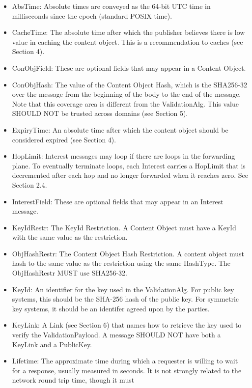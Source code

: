 \documentclass[12pt]{article}
\begin{document}
\begin{itemize}
\item AbsTime: Absolute times are conveyed as the 64-bit UTC time in
      milliseconds since the epoch (standard POSIX time).
\item CacheTime: The absolute time after which the publisher believes
      there is low value in caching the content object.  This is a
      recommendation to caches (see Section 4).
\item ConObjField: These are optional fields that may appear in a
      Content Object.
\item ConObjHash: The value of the Content Object Hash, which is the
   SHA256-32 over the message from the beginning of the body to the
   end of the message.  Note that this coverage area is different
   from the ValidationAlg.  This value SHOULD NOT be trusted across
   domains (see Section 5).
\item ExpiryTime: An absolute time after which the content object should
   be considered expired (see Section 4).
\item HopLimit: Interest messages may loop if there are loops in the
   forwarding plane.  To eventually terminate loops, each Interest
   carries a HopLimit that is decremented after each hop and no
   longer forwarded when it reaches zero.  See Section 2.4.
\item InterestField: These are optional fields that may appear in an
   Interest message.
\item KeyIdRestr: The KeyId Restriction.  A Content Object must have a
   KeyId with the same value as the restriction.
\item ObjHashRestr: The Content Object Hash Restriction.  A content
   object must hash to the same value as the restriction using the
   same HashType.  The ObjHashRestr MUST use SHA256-32.
\item KeyId: An identifier for the key used in the ValidationAlg.  For
   public key systems, this should be the SHA-256 hash of the public
   key.  For symmetric key systems, it should be an identifer agreed
   upon by the parties.
\item KeyLink: A Link (see Section 6) that names how to retrieve the key
   used to verify the ValidationPayload.  A message SHOULD NOT have
   both a KeyLink and a PublicKey.
\item Lifetime: The approximate time during which a requester is willing
   to wait for a response, usually measured in seconds.  It is not
   strongly related to the network round trip time, though it must

\end{itemize}
\end{document}
